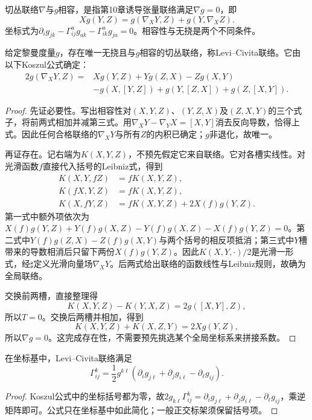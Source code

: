 \begin{definition}[度量相容]
切丛联络$\nabla$与$g$相容，是指第10章诱导张量联络满足$\nabla g=0$，即
\[
 Xg(Y,Z)=g(\nabla_XY,Z)+g(Y,\nabla_XZ).
\]
坐标式为$\partial_i g_{jk}-\Gamma^a_{ij}g_{ak}-\Gamma^a_{ik}g_{ja}=0$。相容性与无挠是两个不同条件。
\end{definition}

\begin{theorem}[黎曼几何基本定理与Koszul公式]\label{thm:levi-civita}
给定黎曼度量$g$，存在唯一无挠且与$g$相容的切丛联络，称Levi--Civita联络。它由以下Koszul公式确定：
\begin{align*}
 2g(\nabla_XY,Z)={}&Xg(Y,Z)+Yg(Z,X)-Zg(X,Y)\\
 &-g(X,[Y,Z])+g(Y,[Z,X])+g(Z,[X,Y]).
\end{align*}
\end{theorem}
\begin{proof}
先证必要性。写出相容性对$(X,Y,Z)$、$(Y,Z,X)$及$(Z,X,Y)$的三个式子，将前两式相加并减第三式。用$\nabla_XY-\nabla_YX=[X,Y]$消去反向导数，恰得上式。因此任何合格联络的$\nabla_XY$与所有$Z$的内积已确定；$g$非退化，故唯一。

再证存在。记右端为$K(X,Y,Z)$，不预先假定它来自联络。它对各槽实线性。对光滑函数$f$直接代入括号的Leibniz式，得到
\begin{align*}
 K(X,Y,fZ)&=fK(X,Y,Z),\\
 K(fX,Y,Z)&=fK(X,Y,Z),\\
 K(X,fY,Z)&=fK(X,Y,Z)+2X(f)g(Y,Z).
\end{align*}
第一式中额外项依次为$X(f)g(Y,Z)+Y(f)g(X,Z)-Y(f)g(X,Z)-X(f)g(Y,Z)=0$。第二式中$Y(f)g(Z,X)-Z(f)g(X,Y)$与两个括号的相反项抵消；第三式中$Y$槽带来的导数相消后只留下两份$X(f)g(Y,Z)$。因此$K(X,Y,\cdot)/2$是光滑一形式，经$\sharp$定义光滑向量场$\nabla_XY$。后两式给出联络的函数线性与Leibniz规则，故确为全局联络。

交换前两槽，直接整理得
\[
 K(X,Y,Z)-K(Y,X,Z)=2g([X,Y],Z),
\]
所以$T=0$。交换后两槽并相加，得到
\[
 K(X,Y,Z)+K(X,Z,Y)=2Xg(Y,Z),
\]
所以$\nabla g=0$。这完成存在性，不需要预先挑选某个全局坐标系来拼接系数。
\end{proof}

\begin{corollary}[Christoffel公式]\label{cor:metric-christoffel}
在坐标基中，Levi--Civita联络满足
\[
 \Gamma^k_{ij}=\frac12g^{k\ell}
 (\partial_i g_{j\ell}+\partial_j g_{i\ell}-\partial_\ell g_{ij}).
\]
\end{corollary}
\begin{proof}
Koszul公式中的坐标括号都为零，故$2g_{k\ell}\Gamma^k_{ij}=\partial_i g_{j\ell}+\partial_j g_{i\ell}-\partial_\ell g_{ij}$，乘逆矩阵即可。公式只在坐标基中如此简化；一般正交标架须保留括号项。
\end{proof}

